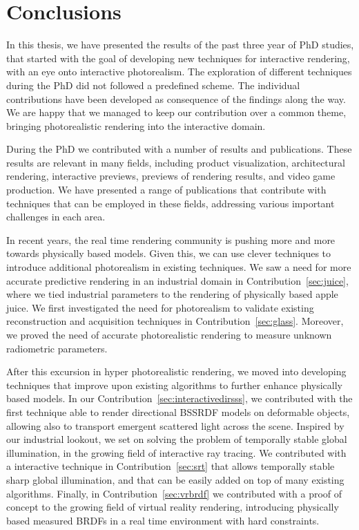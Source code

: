 \chapter{Conclusions}
In this thesis, we have presented the results of the past three year of PhD studies, that started with the goal of developing new techniques for interactive rendering, with an eye onto interactive photorealism. The exploration of different techniques during the PhD did not followed a predefined scheme. The individual contributions have been developed as consequence of the findings along the way. We are happy that we managed to keep our contribution over a common theme, bringing photorealistic rendering into the interactive domain.

During the PhD we contributed with a number of results and publications. These results are relevant in many fields, including product visualization, architectural rendering, interactive previews, previews of rendering results, and video game production. We have presented a range of publications that contribute with techniques that can be employed in these fields, addressing various important challenges in each area. 

In recent years, the real time rendering community is pushing more and more towards physically based models. Given this, we can use clever techniques to introduce additional photorealism in existing techniques. We saw a need for more accurate predictive rendering in an industrial domain in Contribution~\ref{sec:juice}, where we tied industrial parameters to the rendering of physically based apple juice. We first investigated the need for photorealism to validate existing reconstruction and acquisition techniques in Contribution~\ref{sec:glass}. Moreover, we proved the need of accurate photorealistic rendering to measure unknown radiometric parameters. 

After this excursion in hyper photorealistic rendering, we moved into developing techniques that improve upon existing algorithms to further enhance physically based models. In our Contribution~\ref{sec:interactivedirsss}, we contributed with the first technique able to render directional BSSRDF models on deformable objects, allowing also to transport emergent scattered light across the scene. Inspired by our industrial lookout, we set on solving the problem of temporally stable global illumination, in the growing field of interactive ray tracing. We contributed with a interactive technique in Contribution~\ref{sec:srt} that allows temporally stable sharp global illumination, and that can be easily added on top of many existing algorithms. Finally, in Contribution~\ref{sec:vrbrdf} we contributed with a proof of concept to the growing field of virtual reality rendering, introducing physically based measured BRDFs in a real time environment with hard constraints.   

